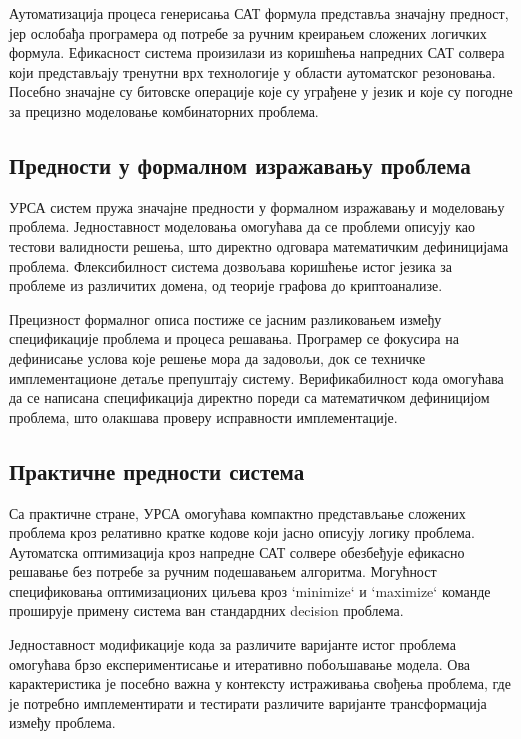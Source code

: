 \documentclass[12pt,oneside]{memoir}
\begin{document}
Аутоматизација процеса генерисања САТ формула представља значајну предност, јер ослобађа програмера од потребе за ручним креирањем сложених логичких формула. Ефикасност система произилази из коришћења напредних САТ солвера који представљају тренутни врх технологије у области аутоматског резоновања. Посебно значајне су битовске операције које су уграђене у језик и које су погодне за прецизно моделовање комбинаторних проблема.

\subsection{Предности у формалном изражавању проблема}

УРСА систем пружа значајне предности у формалном изражавању и моделовању проблема. Једноставност моделовања омогућава да се проблеми описују као тестови валидности решења, што директно одговара математичким дефиницијама проблема. Флексибилност система дозвољава коришћење истог језика за проблеме из различитих домена, од теорије графова до криптоанализе.

Прецизност формалног описа постиже се јасним разликовањем између спецификације проблема и процеса решавања. Програмер се фокусира на дефинисање услова које решење мора да задовољи, док се техничке имплементационе детаље препуштају систему. Верификабилност кода омогућава да се написана спецификација директно пореди са математичком дефиницијом проблема, што олакшава проверу исправности имплементације.

\subsection{Практичне предности система}

Са практичне стране, УРСА омогућава компактно представљање сложених проблема кроз релативно кратке кодове који јасно описују логику проблема. Аутоматска оптимизација кроз напредне САТ солвере обезбеђује ефикасно решавање без потребе за ручним подешавањем алгоритма. Могућност спецификовања оптимизационих циљева кроз `minimize` и `maximize` команде проширује примену система ван стандардних decision проблема.

Једноставност модификације кода за различите варијанте истог проблема омогућава брзо експериментисање и итеративно побољшавање модела. Ова карактеристика је посебно важна у контексту истраживања свођења проблема, где је потребно имплементирати и тестирати различите варијанте трансформација између проблема.
\end{document}
